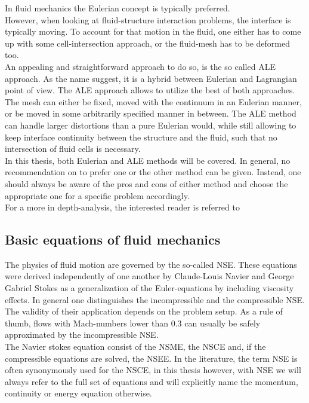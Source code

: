 \documentclass[../main.tex]{subfiles}
\begin{document}
In fluid mechanics the Eulerian concept is typically preferred.\\
However, when looking at fluid-structure interaction problems, the interface is typically moving. To account for that motion in the fluid, one either has to come up with some cell-intersection approach, or the fluid-mesh has to be deformed too.\\
An appealing and straightforward approach to do so, is the so called \acf{ALE} approach. As the name suggest, it is a hybrid between Eulerian and Lagrangian point of view. The \ac{ALE} approach allows to utilize the best of both approaches. The mesh can either be fixed, moved with the continuum in an Eulerian manner, or be moved in some arbitrarily specified manner in between. The \ac{ALE} method can handle larger distortions than a pure Eulerian would, while still allowing to keep interface continuity between the structure and the fluid, such that no intersection of fluid cells is necessary.\\
In this thesis, both Eulerian and \ac{ALE} methods will be covered. In general, no recommendation on to prefer one or the other method can be given. Instead, one should always be aware of the pros and cons of either method and choose the appropriate one for a specific problem accordingly.\\
For a more in depth-analysis, the interested reader is referred to~\cite{LeVeque1992}


\subsection{Basic equations of fluid mechanics}\label{sec:fluid_equations_basic}

The physics of fluid motion are governed by the so-called \acf{NSE}. These equations were derived independently of one another by Claude-Louis Navier and George Gabriel Stokes as a generalization of the Euler-equations by including viscosity effects.
In general one distinguishes the incompressible and the compressible \ac{NSE}. The validity of their application depends on the problem setup. As a rule of thumb, flows with Mach-numbers lower than $0.3$ can usually be safely approximated by the incompressible \ac{NSE}.\\
The Navier stokes equation consist of the \acf{NSME}, the \ac{NSCE} and, if the compressible equations are solved, the \ac{NSEE}. In the literature, the term \ac{NSE} is often synonymously used for the \ac{NSCE}, in this thesis however, with \ac{NSE} we will always refer to the full set of equations and will explicitly name the momentum, continuity or energy equation otherwise.
\end{document}
